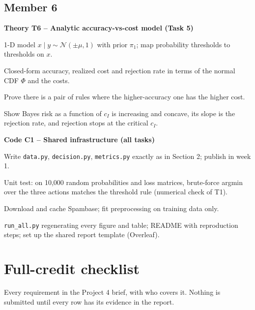 \documentclass[11pt,a4paper]{article}
\begin{document}
\subsection*{Member 6}
\textbf{Theory T6 -- Analytic accuracy-vs-cost model (Task 5)}
\begin{todo}
  \item 1-D model $x\mid y \sim \mathcal{N}(\pm\mu, 1)$ with prior $\pi_1$; map probability thresholds to thresholds on $x$.
  \item Closed-form accuracy, realized cost and rejection rate in terms of the normal CDF $\Phi$ and the costs.
  \item Prove there is a pair of rules where the higher-accuracy one has the higher cost.
  \item Show Bayes risk as a function of $c_I$ is increasing and concave, its slope is the rejection rate, and rejection stops at the critical $c_I$.
\end{todo}
\textbf{Code C1 -- Shared infrastructure (all tasks)}
\begin{todo}
  \item Write \texttt{data.py}, \texttt{decision.py}, \texttt{metrics.py} exactly as in Section 2; publish in week 1.
  \item Unit test: on 10{,}000 random probabilities and loss matrices, brute-force argmin over the three actions matches the threshold rule (numerical check of T1).
  \item Download and cache Spambase; fit preprocessing on training data only.
  \item \texttt{run\_all.py} regenerating every figure and table; README with reproduction steps; set up the shared report template (Overleaf).
\end{todo}

\section{Full-credit checklist}

Every requirement in the Project 4 brief, with who covers it. Nothing is submitted until every row has its evidence in the report.
\end{document}
